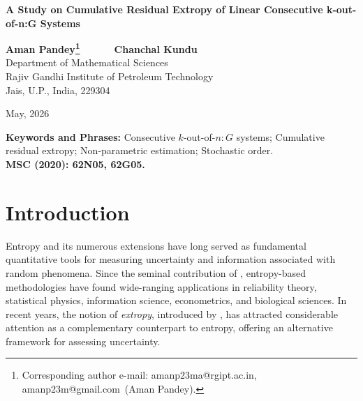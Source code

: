 \documentclass[12pt,a4paper]{article}
\numberwithin{equation}{section}
\renewcommand{\baselinestretch}{1}
\begin{document}
\renewcommand{\baselinestretch}{1.2}
\renewcommand{\theequation}{\thesection.\arabic{equation}}
	\begin{center}
	{\Large\bf A Study on Cumulative Residual Extropy of Linear Consecutive k-out-of-n:G Systems} \\
	\vspace{0.3in}
	
	{\bf Aman Pandey\footnote{Corresponding author e-mail: amanp23ma@rgipt.ac.in, amanp23m@gmail.com~(Aman Pandey).}}~~~~~~~\textbf{Chanchal Kundu}
	\\
	Department of Mathematical Sciences\\ Rajiv Gandhi Institute of Petroleum Technology\\Jais, U.P., India, 229304\\
\begin{center}
    {May, 2026}
\end{center}
\end{center}
\begin{abstract}
In this article, we investigate the cumulative residual extropy associated with linear consecutive $k$-out-of-$n{:}G$ systems, which play an important role in reliability theory and engineering applications. We first derive explicit expressions for the proposed measure and examine the behavior of cumulative residual extropy  under a variety of stochastic orderings. In addition, several  bounds and meaningful results of the characterization are established. Moreover, we also introduced the dynamic version of the cumulative residual extropy and explored the relationship between the proposed dynamic version and the mean residual life function.
From an inferential perspective, we develop a nonparametric estimation procedure for the cumulative residual extropy and establish the corresponding consistency properties of the estimator. The finite-sample performance of the proposed estimator is further investigated through extensive Monte Carlo simulation studies under different parametric settings and validated through a real dataset. 
\end{abstract}
\noindent
\textbf{Keywords and Phrases:} Consecutive $k$-out-of-$n{:}G$ systems; Cumulative residual extropy; Non-parametric estimation; Stochastic order.\\
\noindent
\textbf{MSC (2020): 62N05, 62G05.}
\section{Introduction}
Entropy and its numerous extensions have long served as fundamental quantitative tools for measuring uncertainty and information associated with random phenomena. Since the seminal contribution of \cite{shannon1948}, entropy-based methodologies have found wide-ranging applications in reliability theory, statistical physics, information science, econometrics, and biological sciences. In recent years, the notion of \emph{extropy}, introduced by \cite{lad2015}, has attracted considerable attention as a complementary counterpart to entropy, offering an alternative framework for assessing uncertainty.
\end{document}
